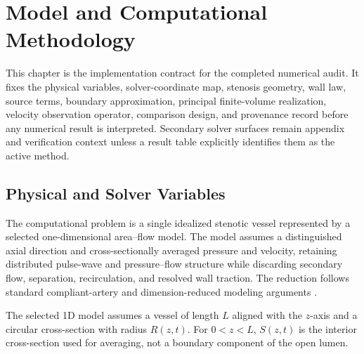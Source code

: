 \section{Model and Computational Methodology}
\label{sec:methodology}

This chapter is the implementation contract for the completed numerical audit.
It fixes the physical variables, solver-coordinate map, stenosis geometry, wall
law, source terms, boundary approximation, principal finite-volume realization,
velocity observation operator, comparison design, and provenance record before
any numerical result is interpreted. Secondary solver surfaces remain appendix
and verification context unless a result table explicitly identifies them as the
active method.

\subsection{Physical and Solver Variables}
\label{subsec:methodology-problem-definition}
\label{subsec:selected-1d-forward-model}
\label{subsec:cross-sectional-variables-governing-equations}
\label{subsubsec:cross-sectional-reduction-selected-1d-model}

The computational problem is a single idealized stenotic vessel represented by a
selected one-dimensional area--flow model. The model assumes a distinguished
axial direction and cross-sectionally averaged pressure and velocity, retaining
distributed pulse-wave and pressure--flow structure while discarding secondary
flow, separation, recirculation, and resolved wall traction. The reduction
follows standard compliant-artery and dimension-reduced modeling arguments
\cite[Sec.~2, pp.~253--257]{FormaggiaEtAl2003OneDimensionalBloodFlow}
\cite[Ch.~3, Secs.~3.2 and~3.6]{KopplHelmig2023DimensionReducedModeling}
\cite[Sec.~3, pp.~24--26]{ShiEtAl2011BloodFlowModelReview}.

\begin{assumption}
    \label{ass:1d-straight-vessel-geometry}
    The selected 1D model assumes a vessel of length $L$ aligned with the
    $z$-axis and a circular cross-section with radius $R(z,t)$. For
    $0<z<L$, $S(z,t)$ is the interior cross-section used for averaging, not
    a boundary component of the open lumen.
\end{assumption}

